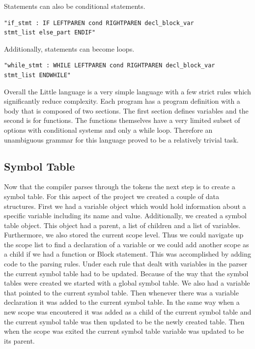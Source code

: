 \documentclass[12pt]{article}
\begin{document}
            Statements can also be conditional statements.
            \begin{verbatim}
"if_stmt : IF LEFTPAREN cond RIGHTPAREN decl_block_var
stmt_list else_part ENDIF"
            \end{verbatim}  
           
            Additionally, statements can become loops.
            \begin{verbatim}
"while_stmt : WHILE LEFTPAREN cond RIGHTPAREN decl_block_var
stmt_list ENDWHILE"
            \end{verbatim}
           
            
            Overall the Little language is a very simple language with a few strict rules which significantly reduce complexity.  Each program has a program definition with a body that is composed of two sections.  The first section defines variables and the second is for functions.  The functions themselves have a very limited subset of options with conditional systems and only a while loop.  Therefore an unambiguous grammar for this language proved to be a relatively trivial task.  
            

        \subsection{Symbol Table}
            Now that the compiler parses through the tokens the next step is to create a symbol table.  For this aspect of the project we created a couple of data structures.  First we had a variable object which would hold information about a specific variable including its name and value.  Additionally, we created a symbol table object.  This object had a parent, a list of children and a list of variables.  Furthermore, we also stored the current scope level.  Thus we could navigate up the scope list to find a declaration of a variable or we could add another scope as a child if we had a function or Block statement.  
            This was accomplished by adding code to the parsing rules.  Under each rule that dealt with variables in the parser the current symbol table had to be updated.  Because of the way that the symbol tables were created we started with a global symbol table.  We also had a variable that pointed to the current symbol table.  Then whenever there was a variable declaration it was added to the current symbol table.  In the same way when a new scope was encoutered it was added as a child of the current symbol table and the current symbol table was then updated to be the newly created table.  Then when the scope was exited the current symbol table variable was updated to be its parent. 
            
\end{document}
